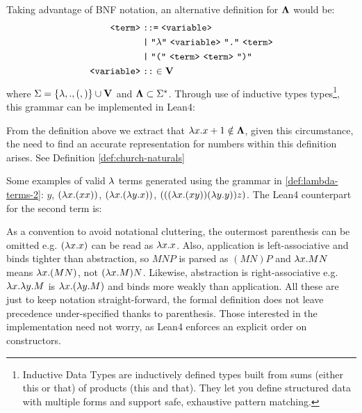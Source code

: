 \begin{definition} Taking advantage of BNF notation, an alternative definition for $\mathbf{\Lambda}$ would be:
  \label{def:lambda-terms-2}
  \begin{align*}
    \texttt{<term>} &\;\texttt{::=}\; \texttt{<variable>} \\
                    &\;\texttt{|}\; \texttt{"$\la$"}\ \texttt{<variable>}\ \texttt{"."}\ \texttt{<term>} \\
                    &\;\texttt{|}\; \texttt{"("}\ \texttt{<term>}\ \texttt{<term>}\ \texttt{")"} \\
    \texttt{<variable>} &\;\texttt{::}\in \Vset
  \end{align*}
  where \( \Sigma = \{ \lambda, ., (, )\} \cup \mathbf{V} \) and \( \mathbf{\Lambda} \subset \Sigma^* \). Through use of inductive types types\footnote{Inductive Data Types are inductively defined types built from sums (either this or that) of products (this and that). They let you define structured data with multiple forms and support safe, exhaustive pattern matching. }, this grammar can be implemented in Lean4:

\end{definition}
\begin{remark}
  From the definition above we extract that \( \lambda x . x + 1 \notin \mathbf{\Lambda} \), given this circumstance, the need to find an accurate representation for numbers within this definition arises. See Definition \ref{def:church-naturals}
\end{remark}
\begin{example} \label{ex:lambda-terms} Some examples of valid $\lambda$ terms generated using the grammar in \ref{def:lambda-terms-2}:
  \( y \),
  \( (\lambda x. (x x)) \),
  \( (\lambda x. (\lambda y. x)) \),
  \( (((\lambda x. (x y)) (\lambda y. y)) z) \).
  The Lean4 counterpart for the second term is:
\end{example}
As a convention to avoid notational cluttering, the outermost parenthesis can be omitted e.g. $ ( \lambda x.x ) $ can be read as $ \lambda x.x $. Also, application is left-associative  and binds tighter than abstraction, so $M N P$ is parsed as $(M N) P$ and $\lambda x . M N$ means $\lambda x . (M N)$, not $(\lambda x . M) N$. Likewise, abstraction is right-associative e.g. $\lambda x . \lambda y . M$ is $\lambda x . (\lambda y . M)$ and binds more weakly than application. All these are just to keep notation straight-forward, the formal definition does not leave precedence under-specified thanks to parenthesis. Those interested in the implementation need not worry, as Lean4 enforces an explicit order on constructors.
